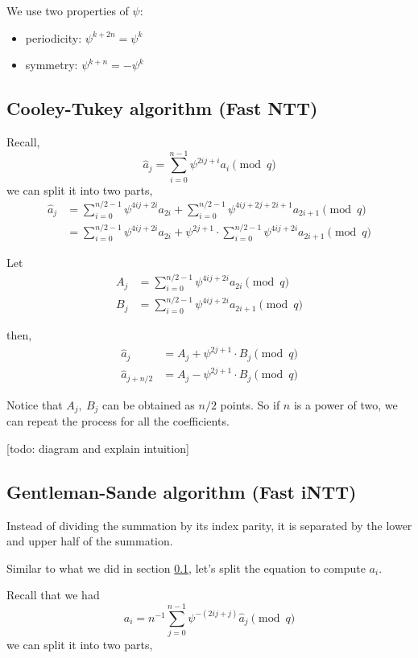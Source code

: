 \documentclass{article}
\begin{document}
We use two properties of $\psi$:
\begin{itemize}
    \item periodicity: $\psi^{k+2n} = \psi^k$
    \item symmetry: $\psi^{k+n} = - \psi^k$
\end{itemize}

\subsection{Cooley-Tukey algorithm (Fast NTT)}\label{sec:CT}
Recall,
$$\hat{a}_j = \sum_{i=0}^{n-1} \psi^{2ij+i} a_i \pmod q$$
we can split it into two parts,
\begin{align*}
    \hat{a}_j &=\sum_{i=0}^{n/2 -1} \psi^{4ij+2i} a_{2i} + \sum_{i=0}^{n/2 -1} \psi^{4ij+2j+2i+1} a_{2i+1} \pmod q \\
	      &=\sum_{i=0}^{n/2 -1} \psi^{4ij+2i} a_{2i} + \psi^{2j+1} \cdot \sum_{i=0}^{n/2-1} \psi^{4ij+2i} a_{2i+1} \pmod q
\end{align*}

Let
\begin{align*}
    A_j &= \sum_{i=0}^{n/2 -1} \psi^{4ij+2i} a_{2i} \pmod q \\
    B_j &= \sum_{i=0}^{n/2-1} \psi^{4ij+2i} a_{2i+1} \pmod q
\end{align*}

then,
\begin{align*}
    \hat{a}_j &= A_j + \psi^{2j+1} \cdot B_j \pmod q \\
    \hat{a}_{j+n/2} &= A_j - \psi^{2j+1} \cdot B_j \pmod q
\end{align*}

Notice that $A_j,~B_j$ can be obtained as $n/2$ points. So if $n$ is a power of
two, we can repeat the process for all the coefficients.

[todo: diagram and explain intuition]

\subsection{Gentleman-Sande algorithm (Fast iNTT)}
Instead of dividing the summation by its index parity, it is separated by the
lower and upper half of the summation.

Similar to what we did in section \ref{sec:CT}, let's split the equation to compute $a_i$.

Recall that we had
$$a_i = n^{-1} \sum_{j=0}^{n-1} \psi^{-(2ij + j)} \hat{a}_j \pmod q$$
we can split it into two parts,
\end{document}
